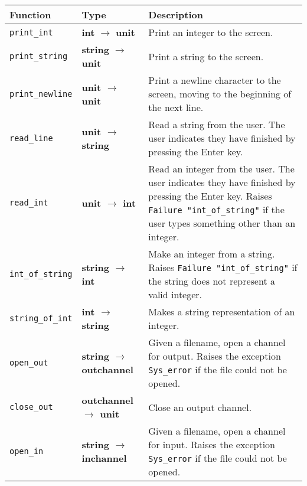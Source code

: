 \documentclass[]{book}
\renewcommand{\arraystretch}{1.2}
\begin{document}
\vspace{8mm}
\bgroup
\def\arraystretch{1.2}
\noindent\begin{tabular}{@{}llp{}@{}} \toprule
Function & Type & Description \\\midrule
\index{print\_int@\texttt{print\_int}}\texttt{print\_int} & \textsf{\textbf{int} $\rightarrow$ \textbf{unit}} & Print an integer to the screen.\\
\index{print\_string@\texttt{print\_string}}\texttt{print\_string} & \textsf{\textbf{string} $\rightarrow$ \textbf{unit}} & Print a string to the screen.\\
\index{print\_newline@\texttt{print\_newline}}\texttt{print\_newline} & \textsf{\textbf{unit $\rightarrow$ unit}} & Print a newline character to the screen, moving to the beginning of the next line.\\
\index{read\_line@\texttt{read\_line}}\texttt{read\_line} & \textsf{\textbf{unit $\rightarrow$ string}} & Read a string from the user. The user indicates they have finished by pressing the Enter key.\\
\index{read\_int@\texttt{read\_int}}\texttt{read\_int} & \textsf{\textbf{unit $\rightarrow$ int}} & Read an integer from the user. The user indicates they have finished by pressing the Enter key. Raises \texttt{Failure\! "int\_of\_string"} if the user types something other than an integer.\\
\index{int\_of\_string@\texttt{int\_of\_string}}\texttt{int\_of\_string} & \textsf{\textbf{string $\rightarrow$ int}} & Make an integer from a string. Raises \texttt{Failure\! "int\_of\_string"} if the string does not represent a valid integer.\\
\index{string\_of\_int@\texttt{string\_of\_int}}\texttt{string\_of\_int} & \textsf{\textbf{int $\rightarrow$ string}} & Makes a string representation of an integer.\\
\index{open\_out}\texttt{open\_out} & \textsf{\textbf{string $\rightarrow$ out\raisebox{2pt}{\_}channel}} & Given a filename, open a channel for output. Raises the exception \index{Sys\_error@\texttt{Sys\_error}}\texttt{Sys\_error} if the file could not be opened.\\
\index{close\_out@\texttt{close\_out}}\texttt{close\_out} & \textsf{\textbf{out\raisebox{2pt}{\_}channel $\rightarrow$ unit}} & Close an output channel.\\
\index{open\_in@\texttt{open\_in}}\texttt{open\_in} & \textsf{\textbf{string $\rightarrow$ in\raisebox{2pt}{\_}channel}} & Given a filename, open a channel for input. Raises the exception \texttt{Sys\_error} if the file could not be opened.\\

\end{tabular}
\end{document}
